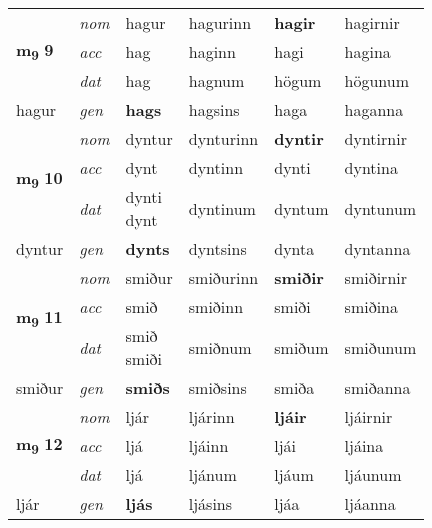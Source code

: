 \begin{longtable}[l]{llllll}
\multirow{3}{*}{{{\textbf{m{\textsubscript{9}}} \Large{\textbf{9}}}}}  & {\footnotesize{{\textit{nom}}}} & hagur & hagurinn    & \textbf{hagir} & hagirnir  \\*
 &  {\footnotesize{{\textit{acc}}}} & hag  & haginn   & hagi  & hagina \\*
 &  {\footnotesize{{\textit{dat}}}} & hag & hagnum   & högum & högunum \\*
 {\footnotesize{hagur}} &   {\footnotesize{{\textit{gen}}}} & \textbf{hags}  & hagsins  & haga & haganna \\
\cmidrule{1-6}


\multirow{3}{*}{{{\textbf{m{\textsubscript{9}}} \Large{\textbf{10}}}}}  & {\footnotesize{{\textit{nom}}}} & dyntur & dynturinn    & \textbf{dyntir} & dyntirnir  \\*
 &  {\footnotesize{{\textit{acc}}}} & dynt  & dyntinn   & dynti  & dyntina \\*
 &  {\footnotesize{{\textit{dat}}}} & \specialcell{dynti\\ dynt} & dyntinum   & dyntum & dyntunum \\*
 {\footnotesize{dyntur}} &   {\footnotesize{{\textit{gen}}}} & \textbf{dynts}  & dyntsins  & dynta & dyntanna \\
\cmidrule{1-6}


\multirow{3}{*}{{{\textbf{m{\textsubscript{9}}} \Large{\textbf{11}}}}}  & {\footnotesize{{\textit{nom}}}} & smiður & smiðurinn    & \textbf{smiðir} & smiðirnir  \\*
 &  {\footnotesize{{\textit{acc}}}} & smið  & smiðinn   & smiði  & smiðina \\*
 &  {\footnotesize{{\textit{dat}}}} & \specialcell{smið\\ smiði} & smiðnum   & smiðum & smiðunum \\*
 {\footnotesize{smiður}} &   {\footnotesize{{\textit{gen}}}} & \textbf{smiðs}  & smiðsins  & smiða & smiðanna \\
\cmidrule{1-6}


\multirow{3}{*}{{{\textbf{m{\textsubscript{9}}} \Large{\textbf{12}}}}}  & {\footnotesize{{\textit{nom}}}} & ljár & ljárinn    & \textbf{ljáir} & ljáirnir  \\*
 &  {\footnotesize{{\textit{acc}}}} & ljá  & ljáinn   & ljái  & ljáina \\*
 &  {\footnotesize{{\textit{dat}}}} & ljá & ljánum   & ljáum & ljáunum \\*
 {\footnotesize{ljár}} &   {\footnotesize{{\textit{gen}}}} & \textbf{ljás}  & ljásins  & ljáa & ljáanna \\
\cmidrule{1-6}



\end{longtable}
